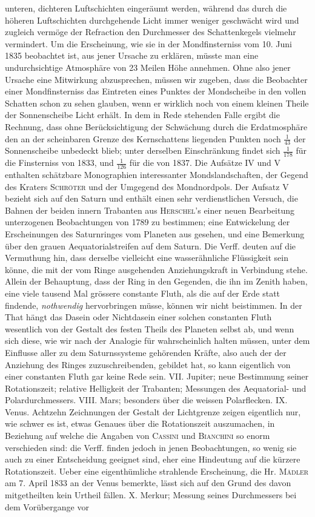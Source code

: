unteren, dichteren Luftschichten eingeräumt werden, während das durch die höheren Luftschichten durchgehende Licht immer weniger geschwächt wird und zugleich vermöge der Refraction den Durchmesser des Schattenkegels vielmehr vermindert. Um die Erscheinung, wie sie in der Mondfinsterniss vom 10. Juni 1835 beobachtet ist, aus jener Ursache zu erklären, müsste man eine undurchsichtige Atmosphäre von 23 Meilen Höhe annehmen. Ohne also jener Ursache eine Mitwirkung abzusprechen, müssen wir zugeben, dass die Beobachter einer Mondfinsterniss das Eintreten eines Punktes der Mondscheibe in den vollen Schatten schon zu sehen glauben, wenn er wirklich noch von einem kleinen Theile der Sonnenscheibe Licht erhält. In dem in Rede stehenden Falle ergibt die Rechnung, dass ohne Berücksichtigung der Schwächung durch die Erdatmosphäre den an der scheinbaren Grenze des Kernschattens liegenden Punkten noch $\frac{1}{43}$ der Sonnenscheibe unbedeckt blieb; unter derselben Einschränkung findet sich $\frac{1}{178}$ für die Finsterniss von 1833, und $\frac{1}{126}$ für die von 1837. Die Aufsätze IV und V enthalten schätzbare Monographien interessanter Mondslandschaften, der Gegend des Kraters \textsc{Schröter} und der Umgegend des Mondnordpols. Der Aufsatz V bezieht sich auf den Saturn und enthält einen sehr verdienstlichen Versuch, die Bahnen der beiden innern Trabanten aus \textsc{Herschel}'s einer neuen Bearbeitung unterzogenen Beobachtungen von 1789 zu bestimmen; eine Entwickelung der Erscheinungen des Saturnringes vom Planeten aus gesehen, und eine Bemerkung über den grauen Aequatorialstreifen auf dem Saturn. Die Verff. deuten auf die Vermuthung hin, dass derselbe vielleicht eine wasserähnliche Flüssigkeit sein könne, die mit der vom Ringe ausgehenden Anziehungskraft in Verbindung stehe. Allein der Behauptung, dass der Ring in den Gegenden, die ihn im Zenith haben, eine viele tausend Mal grössere constante Fluth, als die auf der Erde statt findende, \emph{nothwendig} hervorbringen müsse, können wir nicht beistimmen. In der That hängt das Dasein oder Nichtdasein einer solchen constanten Fluth wesentlich von der Gestalt des festen Theils des Planeten selbst ab, und wenn sich diese, wie wir nach der Analogie für wahrscheinlich halten müssen, unter dem Einflusse aller zu dem Saturnssysteme gehörenden Kräfte, also auch der der Anziehung des Ringes zuzuschreibenden, gebildet hat, so kann eigentlich von einer constanten Fluth gar keine Rede sein. VII. Jupiter; neue Bestimmung seiner Rotationszeit; relative Helligkeit der Trabanten; Messungen des Aequatorial- und Polardurchmessers. VIII. Mars; besonders über die weissen Polarflecken. IX. Venus. Achtzehn Zeichnungen der Gestalt der Lichtgrenze zeigen eigentlich nur, wie schwer es ist, etwas Genaues über die Rotationszeit auszumachen, in Beziehung auf welche die Angaben von \textsc{Cassini} und \textsc{Bianchini} so enorm verschieden sind: die Verff. finden jedoch in jenen Beobachtungen, so wenig sie auch zu einer Entscheidung geeignet sind, eher eine Hindeutung auf die kürzere Rotationszeit. Ueber eine eigenthümliche strahlende Erscheinung, die Hr. \textsc{Mädler} am 7. April 1833 an der Venus bemerkte, lässt sich auf den Grund des davon mitgetheilten kein Urtheil fällen. X. Merkur; Messung seines Durchmessers bei dem Vorübergange vor 